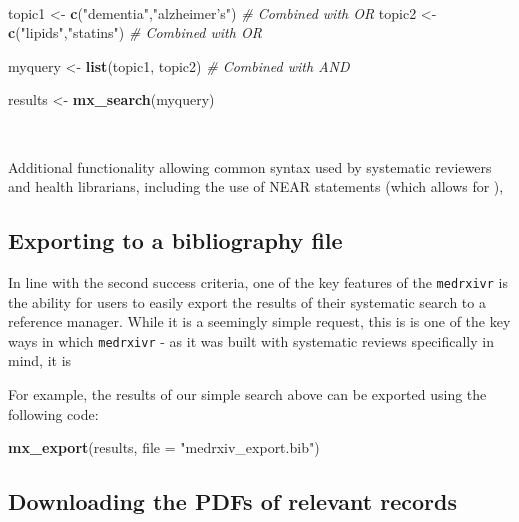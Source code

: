 \documentclass[a4paper, twoside]{templates/ociamthesis}
\newenvironment{Shaded}{\begin{snugshade}}{\end{snugshade}}
\newcommand{\CommentTok}[1]{\textcolor[rgb]{0.56,0.35,0.01}{\textit{#1}}}
\newcommand{\DataTypeTok}[1]{\textcolor[rgb]{0.13,0.29,0.53}{#1}}
\newcommand{\KeywordTok}[1]{\textcolor[rgb]{0.13,0.29,0.53}{\textbf{#1}}}
\newcommand{\NormalTok}[1]{#1}
\newcommand{\StringTok}[1]{\textcolor[rgb]{0.31,0.60,0.02}{#1}}
\renewenvironment{Shaded}
{
  \vspace{4pt}%
  \begin{snugshade}%
}{%
  \end{snugshade}%
  \vspace{4pt}%
}
\begin{document}
~

\begin{Shaded}
\begin{Highlighting}[]
\NormalTok{topic1  <-}\StringTok{ }\KeywordTok{c}\NormalTok{(}\StringTok{"dementia"}\NormalTok{,}\StringTok{"alzheimer's"}\NormalTok{)  }\CommentTok{# Combined with OR}
\NormalTok{topic2  <-}\StringTok{ }\KeywordTok{c}\NormalTok{(}\StringTok{"lipids"}\NormalTok{,}\StringTok{"statins"}\NormalTok{)        }\CommentTok{# Combined with OR}

\NormalTok{myquery <-}\StringTok{ }\KeywordTok{list}\NormalTok{(topic1, topic2)         }\CommentTok{# Combined with AND}

\NormalTok{results <-}\StringTok{ }\KeywordTok{mx_search}\NormalTok{(myquery)}
\end{Highlighting}
\end{Shaded}

~

Additional functionality allowing common syntax used by systematic reviewers and health librarians, including the use of NEAR statements (which allows for ),

\hypertarget{exporting-to-a-bibliography-file}{%
\subsection{Exporting to a bibliography file}\label{exporting-to-a-bibliography-file}}

In line with the second success criteria, one of the key features of the \texttt{medrxivr} is the ability for users to easily export the results of their systematic search to a reference manager. While it is a seemingly simple request, this is is one of the key ways in which \texttt{medrxivr} - as it was built with systematic reviews specifically in mind, it is

For example, the results of our simple search above can be exported using the following code:

\begin{Shaded}
\begin{Highlighting}[]
\KeywordTok{mx_export}\NormalTok{(results, }
          \DataTypeTok{file =} \StringTok{"medrxiv_export.bib"}\NormalTok{)}
\end{Highlighting}
\end{Shaded}

\hypertarget{downloading-the-pdfs-of-relevant-records}{%
\subsection{Downloading the PDFs of relevant records}\label{downloading-the-pdfs-of-relevant-records}}
\end{document}
